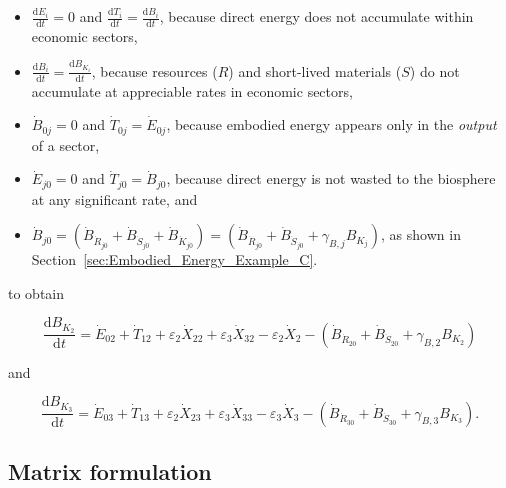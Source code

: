 \begin{itemize}
	\item{$\frac{\mathrm{d}E_i}{\mathrm{d}t} = 0$
		and
		$\frac{\mathrm{d}T_i}{\mathrm{d}t} = \frac{\mathrm{d}B_i}{\mathrm{d}t}$, 
		because direct energy
		does not accumulate within economic sectors,}
	\item{$\frac{\mathrm{d}B_i}{\mathrm{d}t} = \frac{\mathrm{d}B_{K_{i}}}{\mathrm{d}t}$,
		because resources ($R$) and short-lived materials ($S$) do not 
		accumulate at appreciable rates in economic sectors,}
	\item{$\dot{B}_{0j} = 0$ and $\dot{T}_{0j} = \dot{E}_{0j}$,
		because embodied energy appears only in the \emph{output} of a sector,}
	\item{$\dot{E}_{j0} = 0$ and $\dot{T}_{j0} = \dot{B}_{j0}$, 
	because direct energy is not wasted to the biosphere at any significant rate, and} 
	\item{$\dot{B}_{j0} = \left( \dot{B}_{\dot{R}_{j0}} 
							+ \dot{B}_{\dot{S}_{j0}}
							+ \dot{B}_{\dot{K}_{j0}}
							\right)
						= \left( \dot{B}_{\dot{R}_{j0}} 
							+ \dot{B}_{\dot{S}_{j0}}
							+ \gamma_{B,j} B_{K_{j}}
							\right)$, as shown in Section~\ref{sec:Embodied_Energy_Example_C}.}
\end{itemize}

\noindent{}to obtain

\begin{equation} \label{eq:C-Total_Energy_Sec_2-b}
	\frac{\mathrm{d}B_{K_{2}}}{\mathrm{d}t}
	= \dot{E}_{02}
	+ \dot{T}_{12}
	+ \varepsilon_{2} \dot{X}_{22}
	+ \varepsilon_{3} \dot{X}_{32}
	- \varepsilon_{2} \dot{X}_{2}
	- \left( \dot{B}_{\dot{R}_{20}} 
							+ \dot{B}_{\dot{S}_{20}}
							+ \gamma_{B,2} B_{K_{2}}
							\right)
\end{equation}

\noindent{}and

\begin{equation} \label{eq:C-Total_Energy_Sec_3-b}
	\frac{\mathrm{d}B_{K_{3}}}{\mathrm{d}t}
	= \dot{E}_{03}
	+ \dot{T}_{13}
	+ \varepsilon_{2} \dot{X}_{23}
	+ \varepsilon_{3} \dot{X}_{33}
	- \varepsilon_{3} \dot{X}_{3}
	- \left( \dot{B}_{\dot{R}_{30}} 
							+ \dot{B}_{\dot{S}_{30}}
							+ \gamma_{B,3} B_{K_{3}}
							\right).
\end{equation}


\subsection{Matrix formulation} %
\label{sec:C-matrix}

